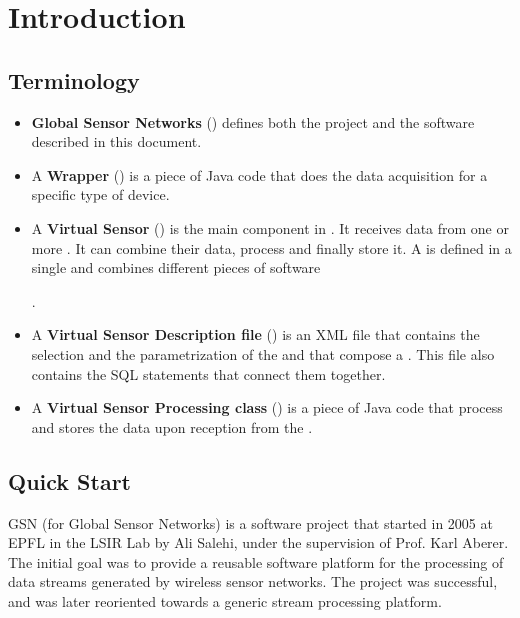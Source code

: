 \chapter{Introduction}

\section{Terminology}

\begin{itemize}
	\item \textbf{Global Sensor Networks} (\gsn) defines both the project and the software described in this document. \\
	\item A \textbf{Wrapper} (\wrapper) is a piece of Java code that does the data acquisition for a specific type of device. \\
	\item A \textbf{Virtual Sensor} (\vs) is the main component in \gsn. It receives data from one or more \wrapper. It can combine their data, 
		process and finally store it. A \vs is defined in a single \vsd and combines different pieces of software 
		. \\	
	\item A \textbf{Virtual Sensor Description file} (\vsd) is an XML file that contains the selection and the parametrization of the \vsp and \wrapper that compose a \vs.
		This file also contains the SQL statements that connect them together. \\
	\item A \textbf{Virtual Sensor Processing class} (\vsp) is a piece of Java code that process and stores the data upon reception from the \wrapper. \\
\end{itemize}

\section{Quick Start}

GSN (for Global Sensor Networks) is a software project that started in
2005 at EPFL in the LSIR Lab by Ali Salehi, under the supervision of
Prof. Karl Aberer. The initial goal was to provide a reusable software
platform for the processing of data streams generated by wireless
sensor networks. The project was successful, and was later reoriented
towards a generic stream processing platform.

